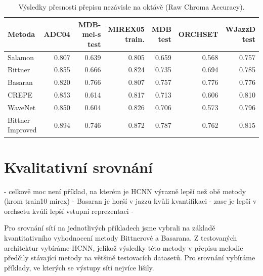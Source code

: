 \begin{table}[h!]
\centering

\begin{tabular}{lrrrrrr}
\toprule
              Metoda & ADC04 & \shortstack[r]{MDB-mel-s \\ test} & \shortstack[r]{MIREX05\\train.} & \shortstack[r]{MDB\\test} & ORCHSET & \shortstack[r]{WJazzD\\test} \\
\midrule
        Salamon & 0.807 &                 0.639 &          0.805 &         0.659 &   0.568 &       0.757 \\
        Bittner & 0.855 &                 0.666 &          0.824 &         0.735 &   0.694 &       0.785 \\
        Basaran & 0.820 &                 0.766 &          0.807 &         0.757 &   0.776 &       0.776 \\
          CREPE & 0.853 &                 0.614 &          0.817 &         0.713 &   0.606 &       0.810 \\
        WaveNet & 0.850 &                 0.604 &          0.826 &         0.706 &   0.573 &       0.796 \\
 \shortstack[r]{Bittner\\Improved}   & 0.894 &                 0.746 &          0.872 &         0.787 &   0.762 &       0.815 \\
\bottomrule
\end{tabular}

\caption{Výsledky přesnosti přepisu nezávisle na oktávě (Raw Chroma Accuracy).}\label{tab:vysledky_RCA}
\end{table}

\section{Kvalitativní srovnání}

- celkově moc není příklad, na kterém je HCNN výrazně lepší než obě metody (krom train10 mirex)
- Basaran je horší v jazzu kvůli kvantifikaci
- zase je lepší v orchsetu kvůli lepší vstupní reprezentaci
- 

Pro srovnání sítí na jednotlivých příkladech jsme vybrali na základě kvantitativního vyhodnocení metody Bittnerové a Basarana. Z testovaných architektur vybíráme HCNN, jelikož výsledky této metody v přepisu melodie předčily stávající metody na většině testovacích datasetů. Pro srovnání vybíráme příklady, ve kterých se výstupy sítí nejvíce lišily.

